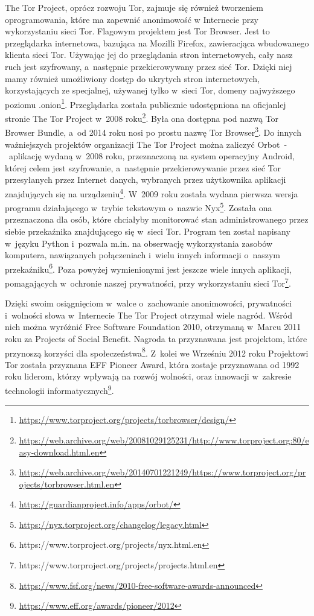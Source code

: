 The Tor Project, oprócz rozwoju Tor, zajmuje się również tworzeniem oprogramowania, które ma zapewnić anonimowość w Internecie przy wykorzystaniu sieci Tor. Flagowym projektem jest Tor Browser. Jest to przeglądarka internetowa, bazująca na Mozilli Firefox, zawieracjąca wbudowanego klienta sieci Tor. Używając jej do przeglądania stron internetowych, cały nasz ruch jest szyfrowany, a~następnie przekierowywany przez sieć Tor. Dzięki niej mamy również umożliwiony dostęp do ukrytych stron internetowych, korzystających ze specjalnej, używanej tylko w~sieci Tor, domeny najwyższego poziomu .onion\footnote{\url{https://www.torproject.org/projects/torbrowser/design/}}. Przeglądarka została publicznie udostępniona na oficjanlej stronie The Tor Project w~2008 roku\footnote{\url{https://web.archive.org/web/20081029125231/http://www.torproject.org:80/easy-download.html.en}}. Była ona dostępna pod nazwą Tor Browser Bundle, a~od 2014 roku nosi po prostu nazwę Tor Browser\footnote{\url{https://web.archive.org/web/20140701221249/https://www.torproject.org/projects/torbrowser.html.en}}. Do innych ważniejszych projektów organizacji The Tor Project można zaliczyć Orbot~-~aplikację wydaną w~2008 roku, przeznaczoną na system operacyjny Android, której celem jest szyfrowanie, a~następnie przekierowywanie przez sieć Tor przesyłanych przez Internet danych, wybranych przez użytkownika aplikacji znajdujących się na urządzeniu\footnote{\url{https://guardianproject.info/apps/orbot/}}. W~2009 roku została wydana pierwsza wersja programu działającego w~trybie tekstowym o~nazwie Nyx\footnote{\url{https://nyx.torproject.org/changelog/legacy.html}}. Została ona przeznaczona dla osób, które chciałyby monitorować stan administrowanego przez siebie przekaźnika znajdującego się w~sieci Tor. Program ten został napisany w~języku Python i~pozwala m.in. na obserwację wykorzystania zasobów komputera, nawiązanych połączeniach i~wielu innych informacji o~naszym przekaźniku\footnote{https://www.torproject.org/projects/nyx.html.en}. Poza powyżej wymienionymi jest jeszcze wiele innych aplikacji, pomagających w~ochronie naszej prywatności, przy wykorzystaniu sieci Tor\footnote{https://www.torproject.org/projects/projects.html.en}.

Dzięki swoim osiągnięciom w~walce o~zachowanie anonimowości, prywatności i~wolności słowa w~Internecie The Tor Project otrzymał wiele nagród. Wśród nich można wyróżnić Free Software Foundation 2010, otrzymaną w~Marcu 2011 roku za Projects of Social Benefit. Nagroda ta przyznawana jest projektom, które przynoszą korzyści dla społeczeństwa\footnote{\url{https://www.fsf.org/news/2010-free-software-awards-announced}}. Z~kolei we Wrześniu 2012 roku Projektowi Tor została przyznana EFF Pioneer Award, która zostaje przyznawana od 1992 roku liderom, którzy wpływają na rozwój wolności, oraz innowacji w~zakresie technologii informatycznych\footnote{\url{https://www.eff.org/awards/pioneer/2012}}.